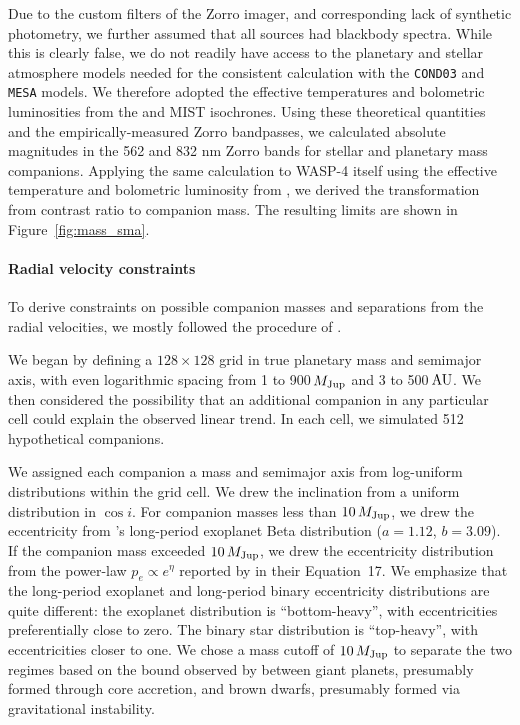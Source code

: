 \documentclass[12pt,twocolumn,tighten]{aastex62}
\begin{document}
Due to the custom filters of the Zorro imager, and corresponding lack
of synthetic photometry, we further assumed that all sources had
blackbody spectra. While this is clearly false, we do not readily have
access to the planetary and stellar atmosphere models needed for the
consistent calculation with the \texttt{COND03} and \texttt{MESA}
models.  We therefore adopted the effective temperatures and
bolometric luminosities from the \citet{baraffe_evolutionary_2003} and
MIST isochrones.  Using these theoretical quantities and the
empirically-measured Zorro bandpasses, we calculated absolute
magnitudes in the 562 and 832 nm Zorro bands for stellar and planetary
mass companions.  Applying the same calculation to WASP-4 itself using
the effective temperature and bolometric luminosity from
, we derived the transformation from
contrast ratio to companion mass.  The resulting limits are shown in
Figure~\ref{fig:mass_sma}.


\paragraph{Radial velocity constraints}

To derive constraints on possible companion masses and separations
from the radial velocities, we mostly followed the procedure of
\citet{bryan_excess_2019}. 

We began by defining a $128\times128$ grid in true planetary mass and
semimajor axis, with even logarithmic spacing from 1 to 900$\,$$M_{\rm
Jup}$ and 3 to 500$\,$${\rm AU}$.  We then considered the possibility
that an additional companion in any particular cell could explain the
observed linear trend.  In each cell, we simulated 512 hypothetical
companions.

We assigned each companion a mass and semimajor axis from log-uniform
distributions within the grid cell. We drew the inclination from a
uniform distribution in $\cos i$.  For companion masses less than
$10\,M_{\rm Jup}$, we drew the eccentricity from
\citet{kipping_beta_2013}'s long-period exoplanet Beta distribution
($a=1.12$, $b=3.09$).  If the companion mass exceeded $10\,M_{\rm
Jup}$, we drew the eccentricity distribution from the power-law $p_e
\propto e^\eta$ reported by \citet{moe_mind_2017} in their
Equation~17.  We emphasize that the long-period exoplanet and
long-period binary eccentricity distributions are quite different: the
exoplanet distribution is ``bottom-heavy'', with eccentricities
preferentially close to zero. The binary star distribution is
``top-heavy'', with eccentricities closer to one.  We chose a mass
cutoff of $10\,M_{\rm Jup}$ to separate the two regimes based on the
bound observed by \citet{schlaufman_evidence_2018} between giant
planets, presumably formed through core accretion, and brown dwarfs,
presumably formed via gravitational instability.
\end{document}
